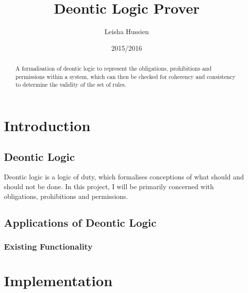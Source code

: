 \documentclass{l4proj}
\begin{document}
\title{Deontic Logic Prover}
\author{Leisha Hussien}
\date{2015/2016}
\maketitle

\begin{abstract}
A formalisation of deontic logic to represent the obligations, prohibitions and permissions within a system, which can then be checked for coherency and consistency to determine the validity of the set of rules.
\end{abstract}

\educationalconsent

\tableofcontents

\chapter{Introduction}

\section{Deontic Logic}
Deontic logic is a logic of duty, which formalises conceptions of what should and should not be done. In this project, I will be primarily concerned with obligations, prohibitions and permissions. 

\section{Applications of Deontic Logic}

\subsection{Existing Functionality}

\chapter{Implementation}
\end{document}
